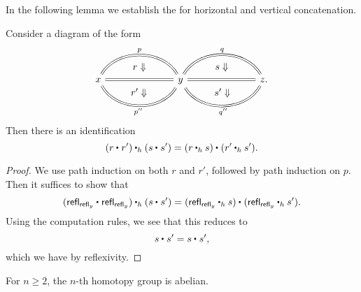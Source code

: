 In the following lemma we establish the  for horizontal and vertical concatenation.

\begin{lem}
Consider a diagram of the form
\begin{equation*}
\begin{tikzcd}[column sep=7em]
x \arrow[r,equals,bend left=60,"p",""{name=A,below}] \arrow[r,equals,""{name=B},""{name=E,below}] \arrow[r,equals,bend right=60,"{p''}"{below},""{name=F,above}] \arrow[from=A,to=B,phantom,"r\Downarrow"] \arrow[from=E,to=F,phantom,"{r'\Downarrow}"] 
& y \arrow[r,equals,bend left=60,"q",""{name=C,below}] \arrow[r,equals,""{name=G,above},""{name=H,below}] \arrow[r,equals,bend right=60,""{name=D,above},"{q''}"{below}] \arrow[from=C,to=G,phantom,"s\Downarrow"] \arrow[from=H,to=D,phantom,"{s'\Downarrow}"] & z.
\end{tikzcd}
\end{equation*}
Then there is an identification
\begin{equation*}
\ct[h]{(\ct{r}{r'})}{(\ct{s}{s'})}=\ct{(\ct[h]{r}{s})}{(\ct[h]{r'}{s'})}.
\end{equation*}
\end{lem}

\begin{proof}
We use path induction on both $r$ and $r'$, followed by path induction on $p$. Then it suffices to show that
\begin{equation*}
\ct[h]{(\ct{\refl{\refl{y}}}{\refl{\refl{y}}})}{(\ct{s}{s'})}=\ct{(\ct[h]{\refl{\refl{y}}}{s})}{(\ct[h]{\refl{\refl{y}}}{s'})}.
\end{equation*}
Using the computation rules, we see that this reduces to
\begin{equation*}
\ct{s}{s'}=\ct{s}{s'},
\end{equation*}
which we have by reflexivity.
\end{proof}

\begin{thm}
For $n\geq 2$, the $n$-th homotopy group is abelian.
\end{thm}

